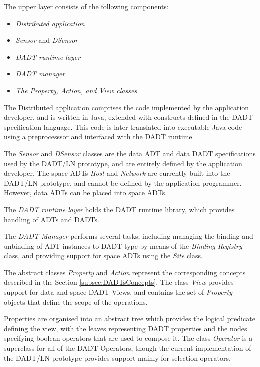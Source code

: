 The upper layer consists of the following components:

\begin{itemize}
\item \emph {Distributed application}
\item \emph{Sensor} and \emph{DSensor}
\item \emph{DADT runtime layer}
\item \emph{DADT manager}
\item \emph{The Property, Action, and View classes}
\end{itemize}

The Distributed application comprises the code implemented by
the application developer, and is written in Java, extended with constructs defined in the DADT
specification language. This code is later  translated into executable Java
code using a preprocesssor and interfaced with the DADT runtime.

The \emph{Sensor} and \emph{DSensor} classes are the data
ADT and data DADT specifications used by the DADT/LN prototype, and are entirely
defined by the application developer. The space ADTs \emph{Host}
and \emph{Network} are currently built into the DADT/LN prototype, and cannot be defined by the application programmer. However, data ADTs can be placed into space ADTs.

The \emph{DADT runtime layer} holds the DADT runtime library, which provides
handling of ADTs and DADTs. 

The \emph{DADT Manager} performs several tasks, including managing the binding and unbinding
of ADT instances to DADT type by means of the  \emph{Binding Registry} class,
and providing support for space ADTs using the \emph{Site} class. 

The abstract classes \emph{Property} and \emph{Action} represent the
corresponding concepts described in the Section \ref{subsec:DADTsConcepts}.
The class \emph{View} provides support for data and space DADT Views, and
contains the set of \emph{Property} objects that define the scope of the
operations. 

Properties are organised into an abstract tree which provides the
logical predicate defining the view, with the leaves representing DADT
properties and the nodes specifying boolean operators that are used to compose it.
The class \emph{Operator} is a superclass for all of the DADT Operators, though
the current implementation of the DADT/LN prototype provides support mainly for
selection operators.

